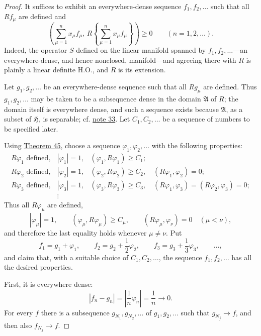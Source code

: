 ﻿\documentclass[paper=b5,fontsize=13pt,bookmarkpackage=false,twoside]{scrartcl}
\begin{document}
\begin{proof}
It suffices to exhibit an everywhere-dense sequence $f_1,f_2,\ldots$ such that all $Rf_\mu$ are defined and
\[
\left(\sum_{\mu=1}^{n}x_\mu f_\mu,\,
R\left\{\sum_{\mu=1}^{n}x_\mu f_\mu\right\}\right)\ge0
\qquad(n=1,2,\ldots).
\]
Indeed, the operator $S$ defined on the linear manifold spanned by $f_1,f_2,\ldots$---an everywhere-dense, and hence nonclosed, manifold---and agreeing there with $R$ is plainly a linear definite H.O., and $R$ is its extension.

Let $g_1,g_2,\ldots$ be an everywhere-dense sequence such that all $Rg_\mu$ are defined. Thus $g_1,g_2,\ldots$ may be taken to be a subsequence dense in the domain $\mathfrak A$ of $R$; the domain itself is everywhere dense, and such a sequence exists because $\mathfrak A$, as a subset of $\mathfrak H$, is separable; cf. \hyperref[fn:33]{note 33}. Let $C_1,C_2,\ldots$ be a sequence of numbers to be specified later.

Using \hyperref[thm:45]{Theorem 45}, choose a sequence $\varphi_1,\varphi_2,\ldots$ with the following properties:
\[
\begin{array}{lll}
R\varphi_1\text{ defined},&
|\varphi_1|=1,&
(\varphi_1,R\varphi_1)\ge C_1;\\
R\varphi_2\text{ defined},&
|\varphi_2|=1,&
(\varphi_2,R\varphi_2)\ge C_2,\quad
(R\varphi_1,\varphi_2)=0;\\
R\varphi_3\text{ defined},&
|\varphi_3|=1,&
(\varphi_3,R\varphi_3)\ge C_3,\quad
(R\varphi_1,\varphi_3)=(R\varphi_2,\varphi_3)=0;\\
&\vdots&
\end{array}
\]
Thus all $R\varphi_\mu$ are defined,
\[
|\varphi_\mu|=1,\qquad
(\varphi_\mu,R\varphi_\mu)\ge C_\mu,
\qquad
(R\varphi_\mu,\varphi_\nu)=0
\quad(\mu<\nu),
\]
and therefore the last equality holds whenever $\mu\ne\nu$. Put
\[
f_1=g_1+\varphi_1,\qquad
f_2=g_2+\frac12\varphi_2,\qquad
f_3=g_3+\frac13\varphi_3,\qquad\ldots,
\]
and claim that, with a suitable choice of $C_1,C_2,\ldots$, the sequence $f_1,f_2,\ldots$ has all the desired properties.

First, it is everywhere dense:
\[
|f_n-g_n|=\left|\frac1n\varphi_n\right|=\frac1n\longrightarrow0.
\]
For every $f$ there is a subsequence $g_{N_1},g_{N_2},\ldots$ of $g_1,g_2,\ldots$ such that $g_{N_j}\to f$, and then also $f_{N_j}\to f$.


\end{proof}
\end{document}
